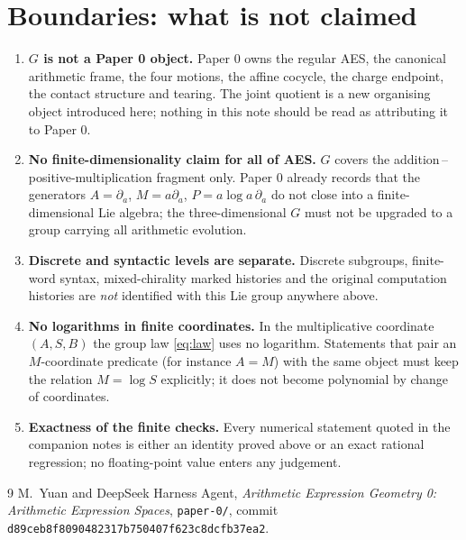 \documentclass[11pt]{article}
\begin{document}
\section{Boundaries: what is not claimed}
\label{sec:boundaries}

\begin{enumerate}
\item \textbf{$G$ is not a Paper 0 object.} Paper 0 owns the regular AES, the
canonical arithmetic frame, the four motions, the affine cocycle, the charge
endpoint, the contact structure and tearing. The joint quotient is a new
organising object introduced here; nothing in this note should be read as
attributing it to Paper 0.
\item \textbf{No finite-dimensionality claim for all of AES.} $G$ covers the
addition\,--\,positive-multiplication fragment only. Paper 0 already records that
the generators $A=\partial_a$, $M=a\partial_a$, $P=a\log a\,\partial_a$ do not
close into a finite-dimensional Lie algebra; the three-dimensional $G$ must not
be upgraded to a group carrying all arithmetic evolution.
\item \textbf{Discrete and syntactic levels are separate.} Discrete subgroups,
finite-word syntax, mixed-chirality marked histories and the original
computation histories are \emph{not} identified with this Lie group anywhere
above.
\item \textbf{No logarithms in finite coordinates.} In the multiplicative
coordinate $(A,S,B)$ the group law \eqref{eq:law} uses no logarithm. Statements
that pair an $M$-coordinate predicate (for instance $A=M$) with the same object
must keep the relation $M=\log S$ explicitly; it does not become polynomial by
change of coordinates.
\item \textbf{Exactness of the finite checks.} Every numerical statement quoted
in the companion notes is either an identity proved above or an exact rational
regression; no floating-point value enters any judgement.
\end{enumerate}

\begin{thebibliography}{9}
M.~Yuan and DeepSeek Harness Agent,
\emph{Arithmetic Expression Geometry 0: Arithmetic Expression Spaces},
\texttt{paper-0/}, commit \texttt{d89ceb8f8090482317b750407f623c8dcfb37ea2}.
\end{thebibliography}
\end{document}
